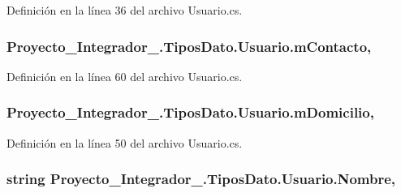 Definición en la línea 36 del archivo Usuario.\-cs.

\hypertarget{class_proyecto___integrador__3_1_1_tipos_dato_1_1_usuario_a2c64e3cc33009cfc51e7f68fb28024e5}{
\subsubsection[{m\-Contacto}]{ Proyecto\-\_\-\-Integrador\-\_.\-Tipos\-Dato.\-Usuario.\-m\-Contacto\hspace{0.3cm}{\ttfamily [get]}, {\ttfamily [set]}}}\label{class_proyecto___integrador__3_1_1_tipos_dato_1_1_usuario_a2c64e3cc33009cfc51e7f68fb28024e5}


Definición en la línea 60 del archivo Usuario.\-cs.

\hypertarget{class_proyecto___integrador__3_1_1_tipos_dato_1_1_usuario_aa5cabdf3a53f849c78040fc52b58d63f}{
\subsubsection[{m\-Domicilio}]{ Proyecto\-\_\-\-Integrador\-\_.\-Tipos\-Dato.\-Usuario.\-m\-Domicilio\hspace{0.3cm}{\ttfamily [get]}, {\ttfamily [set]}}}\label{class_proyecto___integrador__3_1_1_tipos_dato_1_1_usuario_aa5cabdf3a53f849c78040fc52b58d63f}


Definición en la línea 50 del archivo Usuario.\-cs.

\hypertarget{class_proyecto___integrador__3_1_1_tipos_dato_1_1_usuario_a3e82a41aeb5d99fb13d1d69ed40b1cb9}{
\subsubsection[{Nombre}]{\setlength{\rightskip}{0pt plus 5cm}string Proyecto\-\_\-\-Integrador\-\_.\-Tipos\-Dato.\-Usuario.\-Nombre\hspace{0.3cm}{\ttfamily [get]}, {\ttfamily [set]}}}\label{class_proyecto___integrador__3_1_1_tipos_dato_1_1_usuario_a3e82a41aeb5d99fb13d1d69ed40b1cb9}


